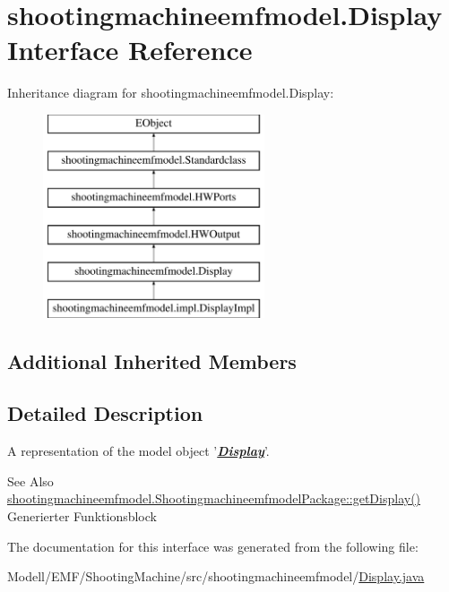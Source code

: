 \hypertarget{interfaceshootingmachineemfmodel_1_1_display}{\section{shootingmachineemfmodel.\-Display Interface Reference}
\label{interfaceshootingmachineemfmodel_1_1_display}
}
Inheritance diagram for shootingmachineemfmodel.\-Display\-:\begin{figure}[H]
\begin{center}
\leavevmode
\includegraphics[height=6.000000cm]{interfaceshootingmachineemfmodel_1_1_display}
\end{center}
\end{figure}
\subsection*{Additional Inherited Members}


\subsection{Detailed Description}
A representation of the model object '{\itshape {\bfseries \hyperlink{interfaceshootingmachineemfmodel_1_1_display}{Display}}}'.

\begin{DoxySeeAlso}{See Also}
\hyperlink{interfaceshootingmachineemfmodel_1_1_shootingmachineemfmodel_package_aa6b8937df7496f782eef12f9112a0544}{shootingmachineemfmodel.\-Shootingmachineemfmodel\-Package\-::get\-Display()}  Generierter Funktionsblock 
\end{DoxySeeAlso}


The documentation for this interface was generated from the following file\-:\begin{DoxyCompactItemize}
\item 
Modell/\-E\-M\-F/\-Shooting\-Machine/src/shootingmachineemfmodel/\hyperlink{_display_8java}{Display.\-java}\end{DoxyCompactItemize}
